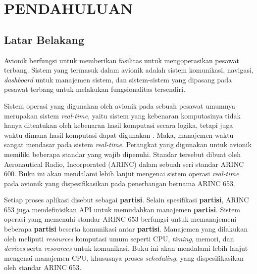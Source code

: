 \chapter{PENDAHULUAN}

\section{Latar Belakang}

Avionik berfungsi untuk memberikan fasilitas untuk mengoperasikan pesawat terbang.
Sistem yang termasuk dalam avionik adalah sistem komunikasi, navigasi, \textit{dashboard} untuk manajemen sistem, dan sistem-sistem yang dipasang pada pesawat terbang untuk melakukan fungsionalitas tersendiri.


Sistem operasi yang digunakan oleh avionik pada sebuah pesawat umumnya merupakan sistem \textit{real-time}, yaitu sistem yang kebenaran komputasinya tidak hanya ditentukan oleh kebenaran hasil komputasi secara logika, tetapi juga waktu dimana hasil komputasi dapat digunakan \citep[p.~6]{Shin1994}.
Maka, manajemen waktu sangat mendasar pada sistem \textit{real-time}.
Perangkat yang digunakan untuk avionik memiliki beberapa standar yang wajib dipenuhi.
Standar tersebut dibuat oleh Aeronautical Radio, Incorporated (ARINC) dalam sebuah seri standar ARINC 600.
Buku ini akan mendalami lebih lanjut mengenai sistem operasi \textit{real-time} pada avionik yang dispesifikasikan pada penerbangan bernama ARINC 653.


Setiap proses aplikasi disebut sebagai \textbf{partisi}.
Selain spesifikasi \textbf{partisi}, ARINC 653 juga mendefinisikan API untuk memudahkan manajemen \textbf{partisi}.
Sistem operasi yang memenuhi standar ARINC 653 berfungsi untuk memanajemeni beberapa \textbf{partisi} beserta komunikasi antar \textbf{partisi}.
Manajemen yang dilakukan oleh meliputi \textit{resources} komputasi umum seperti CPU, \textit{timing}, memori, dan \textit{devices} serta \textit{resources} untuk komunikasi.
Buku ini akan mendalami lebih lanjut mengenai manajemen CPU, khususnya proses \textit{scheduling}, yang dispesifikasikan oleh standar ARINC 653.


